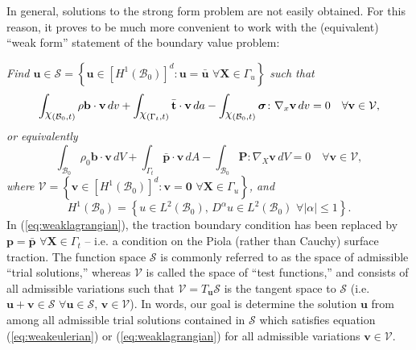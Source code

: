 In general, solutions to the strong form problem are not easily obtained. For this reason, it proves to be much more convenient to work with the (equivalent) ``weak form'' statement of the boundary value problem:

\textit{Find $\mathbf{u} \in \mathcal{S} = \left\{ \mathbf{u} \in \left[H^{1} (\mathcal{B}_0)\right]^d \colon \mathbf{u} = \bar{\mathbf{u}} \, \, \forall \mathbf{X} \in \Gamma_u \right\}$ such that}
\begin{equation}
  \int_{\raisebox{\depth}{$\chi$} (\mathcal{B}_0, t)} \rho \mathbf{b} \cdot \mathbf{v} \, dv + \int_{\raisebox{\depth}{$\chi$} (\Gamma_t, t)} \bar{\mathbf{t}} \cdot \mathbf{v} \, da - \int_{\raisebox{\depth}{$\chi$} (\mathcal{B}_0, t)} \boldsymbol{\sigma} \colon \nabla_x \mathbf{v} \, dv = 0 \quad \forall \mathbf{v} \in \mathcal{V},
  \label{eq:weakeulerian}
\end{equation}
\textit{or equivalently}
\begin{equation}
  \int_{\mathcal{B}_0} \rho_0 \mathbf{b} \cdot \mathbf{v} \, dV + \int_{\Gamma_t} \bar{\mathbf{p}} \cdot \mathbf{v} \, dA - \int_{\mathcal{B}_0} \mathbf{P} \colon \nabla_X \mathbf{v} \, dV = 0 \quad \forall \mathbf{v} \in \mathcal{V},
  \label{eq:weaklagrangian}
\end{equation}
\textit{where $\mathcal{V} = \left\{ \mathbf{v} \in \left[H^{1} (\mathcal{B}_0)\right]^d \colon \mathbf{v} = \mathbf{0} \, \, \forall \mathbf{X} \in \Gamma_u \right\}$, and}
\begin{equation}
  H^{1} (\mathcal{B}_0) = \left\{ u \in L^2 (\mathcal{B}_0), \, D^{\alpha} u \in L^2 (\mathcal{B}_0) \, \, \forall | \alpha | \leq 1 \right\}.
\end{equation}
In (\ref{eq:weaklagrangian}), the traction boundary condition has been replaced by $\mathbf{p} = \bar{\mathbf{p}} \, \, \forall \mathbf{X} \in \Gamma_t$ -- i.e. a condition on the Piola (rather than Cauchy) surface traction. The function space $\mathcal{S}$ is commonly referred to as the space of admissible ``trial solutions,'' whereas $\mathcal{V}$ is called the space of ``test functions,'' and consists of all admissible variations such that $\mathcal{V} = T_{\mathbf{u}} \mathcal{S}$ is the tangent space to $\mathcal{S}$ (i.e. $\mathbf{u} + \mathbf{v} \in \mathcal{S} \, \, \forall \mathbf{u} \in \mathcal{S}, \, \mathbf{v} \in \mathcal{V}$). In words, our goal is determine the solution $\mathbf{u}$ from among all admissible trial solutions contained in $\mathcal{S}$ which satisfies equation (\ref{eq:weakeulerian}) or (\ref{eq:weaklagrangian}) for all admissible variations $\mathbf{v} \in \mathcal{V}$.

